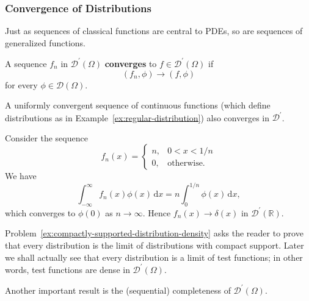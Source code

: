 \subsubsection{Convergence of Distributions}\label{subsec:distribution-convergence}

Just as sequences of classical functions are central to PDEs, so are sequences of generalized functions.

\begin{Definition}
\label{def:distribution-convergence}
A sequence $f_n$ in $\mathcal{D}^{\prime}(\Omega)$ \textbf{converges} to $f\in\mathcal{D}^{\prime}(\Omega)$ if \[(f_n,\phi)\to(f,\phi)\] for every $\phi\in\mathcal{D}(\Omega)$.
\end{Definition}

\begin{Example}
\label{ex:uniform-convergence-distribution}
A uniformly convergent sequence of continuous functions (which define distributions as in Example~\ref{ex:regular-distribution}) also converges in $\mathcal{D}^{\prime}$.
\end{Example}

\begin{Example}
\label{ex:delta-rectangular-approximation}
Consider the sequence
\begin{equation}\label{eq:delta-approximating-rectangular-sequence}
f_n(x)=\begin{cases}n,&0<x<1/n\\0,&\text{otherwise.}\end{cases}
\end{equation}
We have
\begin{equation}\label{eq:delta-rectangular-sequence-pairing}
\int_{-\infty}^{\infty}f_n(x)\phi(x)\,\mathrm{d}x=n\int_0^{1/n}\phi(x)\,\mathrm{d}x,
\end{equation}
which converges to $\phi(0)$ as $n\to\infty$. Hence $f_n(x)\to\delta(x)$ in $\mathcal{D}^{\prime}(\mathbb{R})$.
\end{Example}

\begin{Remark}
\label{rem:distribution-density}
Problem~\ref{ex:compactly-supported-distribution-density} asks the reader to prove that every distribution is the limit of distributions with compact support. Later we shall actually see that every distribution is a limit of test functions; in other words, test functions are dense in $\mathcal{D}^{\prime}(\Omega)$.
\end{Remark}

Another important result is the (sequential) completeness of $\mathcal{D}^{\prime}(\Omega)$.

